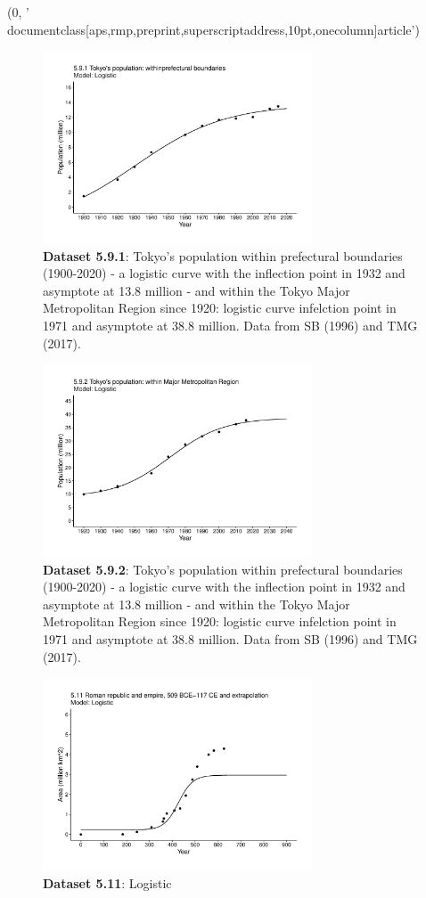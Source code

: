 (0, '\\documentclass[aps,rmp,preprint,superscriptaddress,10pt,onecolumn]{article}\n')
\begin{document}
\begin{figure}[h]
\includegraphics[width=8cm]{output/figs-ggplot/5.9.1.pdf}
\caption{\textbf{Dataset 5.9.1}: Tokyo's population within prefectural boundaries (1900-2020) - a logistic curve with the inflection point in 1932 and asymptote at 13.8 million - and within the Tokyo Major Metropolitan Region since 1920: logistic curve infelction point in 1971 and asymptote at 38.8 million. Data from SB (1996) and TMG (2017). }
\end{figure}
	
\begin{figure}[h]
\includegraphics[width=8cm]{output/figs-ggplot/5.9.2.pdf}
\caption{\textbf{Dataset 5.9.2}: Tokyo's population within prefectural boundaries (1900-2020) - a logistic curve with the inflection point in 1932 and asymptote at 13.8 million - and within the Tokyo Major Metropolitan Region since 1920: logistic curve infelction point in 1971 and asymptote at 38.8 million. Data from SB (1996) and TMG (2017). }
\end{figure}
	
\begin{figure}[h]
\includegraphics[width=8cm]{output/figs-ggplot/5.11.pdf}
\caption{\textbf{Dataset 5.11}: Logistic}
\end{figure}
	
\end{document}
